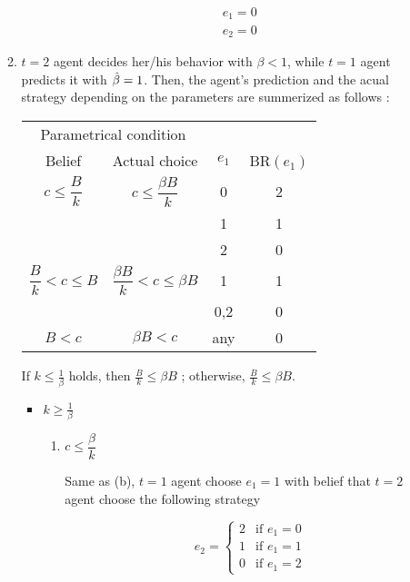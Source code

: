 \documentclass{jsarticle}
\begin{document}
\begin{enumerate}
\begin{enumerate}
\begin{itemize}
\begin{align*}
e_1=0 \\
e_2=0
\end{align*}

\end{itemize}

\newpage

\item

$t=2$ agent decides her/his behavior with $\beta<1$, while $t=1$ agent predicts it with $\Hat{\beta}=1$. Then, the agent's prediction and the acual strategy depending on the parameters are summerized as follows :


\begin{center}

 \begin{tabular}{cccc} \hline
 \multicolumn{2}{c}{Parametrical condition} & & \\
 \multicolumn{1}{c}{Belief} & \multicolumn{1}{c}{Actual choice} & $e_1$ & BR$(e_1)$ \\ \hline
 $c \leq \dfrac{B}{k}$ & $c \leq \dfrac{\beta B}{k}$ & 0 &2 \\
  & & 1 & 1 \\
  & & 2 & 0 \\
 $\dfrac{B}{k} < c \leq B$ & $\dfrac{\beta B}{k} < c \leq \beta B$ & 1 &1 \\
  & & 0,2 & 0 \\
 $B < c$ & $\beta B < c$ & any & 0 \\ \hline
 \end{tabular}

\end{center}

\vspace{1zw}

If $k \leq \frac{1}{\beta}$ holds, then $\frac{B}{k} \leq \beta B$ ; otherwise, $\frac{B}{k} \leq \beta B$.

\begin{itemize}

\item $k \geq \frac{1}{\beta}$

 \begin{enumerate}
 
 \item $c \leq \dfrac{\beta}{k}$
 
 Same as (b), $t=1$ agent choose $e_1=1$ with belief that $t=2$ agent choose the following strategy
 
 \[e_2 = \begin{cases}
 2 & \text{if } e_1=0 \\
 1 & \text{if } e_1=1 \\
 0 & \text{if } e_1=2
 \end{cases} \]
 

\end{enumerate}
\end{itemize}
\end{enumerate}
\end{enumerate}
\end{document}
